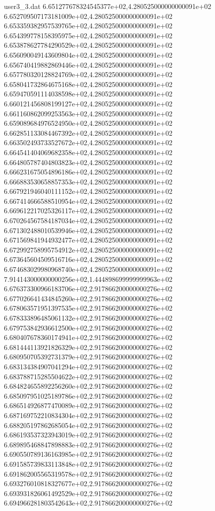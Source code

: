 \begin{filecontents}{user3_3.dat}
6.651277678324545377e+02,4.280525000000000091e+02
6.652709507173181009e+02,4.280525000000000091e+02
6.653359382957539765e+02,4.280525000000000091e+02
6.654399778158395975e+02,4.280525000000000091e+02
6.653878627784290529e+02,4.280525000000000091e+02
6.656090049143609804e+02,4.280525000000000091e+02
6.656740419882869446e+02,4.280525000000000091e+02
6.657780320128824769e+02,4.280525000000000091e+02
6.658041732864675168e+02,4.280525000000000091e+02
6.659470591114038598e+02,4.280525000000000091e+02
6.660121456808199127e+02,4.280525000000000091e+02
6.661160862099253563e+02,4.280525000000000091e+02
6.659089684976524950e+02,4.280525000000000091e+02
6.662851133084467392e+02,4.280525000000000091e+02
6.663502493733527672e+02,4.280525000000000091e+02
6.664541404069682358e+02,4.280525000000000091e+02
6.664805787404803823e+02,4.280525000000000091e+02
6.666231675054896186e+02,4.280525000000000091e+02
6.666883530658857353e+02,4.280525000000000091e+02
6.667921946040111152e+02,4.280525000000000091e+02
6.667414666588510954e+02,4.280525000000000091e+02
6.669612217025326117e+02,4.280525000000000091e+02
6.670264567584187034e+02,4.280525000000000091e+02
6.671302488010539946e+02,4.280525000000000091e+02
6.671569841944932477e+02,4.280525000000000091e+02
6.672992758995754912e+02,4.280525000000000091e+02
6.673645604509516716e+02,4.280525000000000091e+02
6.674683029980968740e+02,4.280525000000000091e+02
7.914143000000000256e+02,1.444898699999999963e+02
6.676373300966183706e+02,2.917866200000000276e+02
6.677026641434845260e+02,2.917866200000000276e+02
6.678063571951397535e+02,2.917866200000000276e+02
6.678333896485061132e+02,2.917866200000000276e+02
6.679753842936612500e+02,2.917866200000000276e+02
6.680407678360174941e+02,2.917866200000000276e+02
6.681444113921826329e+02,2.917866200000000276e+02
6.680950705392731379e+02,2.917866200000000276e+02
6.683134384907041294e+02,2.917866200000000276e+02
6.683788715285504622e+02,2.917866200000000276e+02
6.684824655892256260e+02,2.917866200000000276e+02
6.685097951025189786e+02,2.917866200000000276e+02
6.686514926877470089e+02,2.917866200000000276e+02
6.687169752210834304e+02,2.917866200000000276e+02
6.688205197862685054e+02,2.917866200000000276e+02
6.686193537323943019e+02,2.917866200000000276e+02
6.689895468847898883e+02,2.917866200000000276e+02
6.690550789136163985e+02,2.917866200000000276e+02
6.691585739833113848e+02,2.917866200000000276e+02
6.691862005565319578e+02,2.917866200000000276e+02
6.693276010818327677e+02,2.917866200000000276e+02
6.693931826061492529e+02,2.917866200000000276e+02
6.694966281803542643e+02,2.917866200000000276e+02

\end{filecontents}
